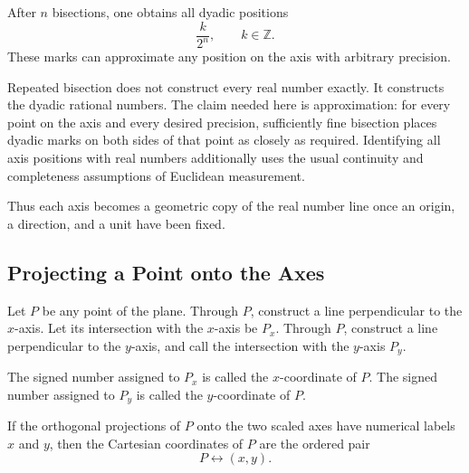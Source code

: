 After $n$ bisections, one obtains all dyadic positions
\[
\frac{k}{2^n},
\qquad k\in\mathbb Z.
\]
These marks can approximate any position on the axis with arbitrary precision.

\begin{remarkbox}
Repeated bisection does not construct every real number exactly.  It constructs
the dyadic rational numbers.  The claim needed here is approximation: for every
point on the axis and every desired precision, sufficiently fine bisection
places dyadic marks on both sides of that point as closely as required.
Identifying all axis positions with real numbers additionally uses the usual
continuity and completeness assumptions of Euclidean measurement.
\end{remarkbox}

Thus each axis becomes a geometric copy of the real number line once an origin,
a direction, and a unit have been fixed.

\subsection{Projecting a Point onto the Axes}

Let $P$ be any point of the plane.  Through $P$, construct a line perpendicular
to the $x$-axis.  Let its intersection with the $x$-axis be $P_x$.  Through
$P$, construct a line perpendicular to the $y$-axis, and call the intersection
with the $y$-axis $P_y$.

\begin{center}
\end{center}

The signed number assigned to $P_x$ is called the $x$-coordinate of $P$.  The
signed number assigned to $P_y$ is called the $y$-coordinate of $P$.

\begin{definitionbox}
If the orthogonal projections of $P$ onto the two scaled axes have numerical
labels $x$ and $y$, then the Cartesian coordinates of $P$ are the ordered pair
\[
P\longleftrightarrow (x,y).
\]
\end{definitionbox}

